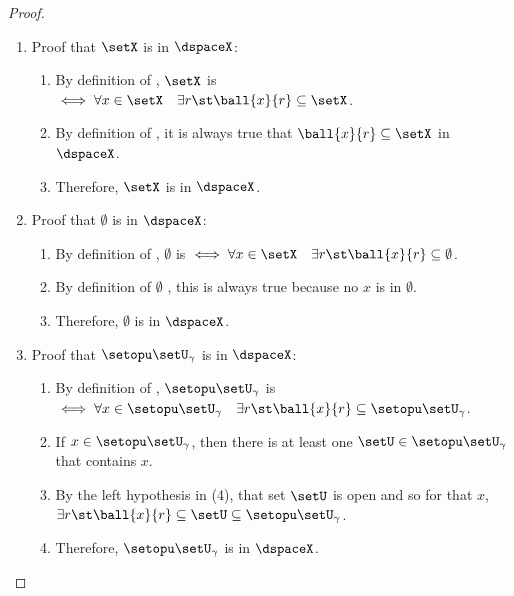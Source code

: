 \begin{proof}
\begin{enumerate}
  \item Proof that $\setX$ is  in $\dspaceX$:
    \begin{enumerate}
      \item By definition of  , 
            $\setX$ is  $\iff \forall x\in\setX \quad\exists r \st \ball{x}{r}\subseteq \setX$.
      \item By definition of  , it is always true that $\ball{x}{r}\subseteq\setX$ in $\dspaceX$.
      \item Therefore, $\setX$ is  in $\dspaceX$.
    \end{enumerate}

  \item Proof that $\emptyset$ is  in $\dspaceX$:
    \begin{enumerate}
      \item By definition of  , 
            $\emptyset$ is  $\iff \forall x\in\setX \quad\exists r \st \ball{x}{r}\subseteq \emptyset$.
      \item By definition of  $\emptyset$ , this is always true because no $x$ is in $\emptyset$.
      \item Therefore, $\emptyset$ is  in $\dspaceX$.
    \end{enumerate}

  \item Proof that $\setopu\setU_\gamma$ is  in $\dspaceX$:
    \begin{enumerate}
      \item By definition of  , 
            $\setopu\setU_\gamma$ is  $\iff \forall x\in\setopu\setU_\gamma \quad\exists r \st \ball{x}{r}\subseteq\setopu\setU_\gamma$.
      \item If $x\in\setopu\setU_\gamma$, then there is at least one $\setU\in\setopu\setU_\gamma$ that contains $x$.
      \item By the left hypothesis in (4), that set $\setU$ is open and so for that $x$,
            $\exists r \st \ball{x}{r}\subseteq\setU\subseteq\setopu\setU_\gamma$.
      \item Therefore, $\setopu\setU_\gamma$ is  in $\dspaceX$.
    \end{enumerate}


\end{enumerate}
\end{proof}

